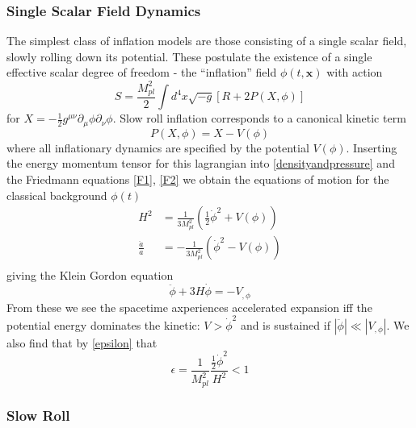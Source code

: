 \documentclass[a4paper,10pt]{article}
\renewcommand{\v}[1]{\mathbf{#1}}
\newcommand{\Mp}{M_{pl}}
\newcommand{\half}{\frac{1}{2}}
\begin{document}
\subsubsection{Single Scalar Field Dynamics}

The simplest class of inflation models are those consisting of a single scalar field, slowly rolling down its potential. These postulate the existence of a single effective scalar degree of freedom - the ``inflation'' field $\phi(t,\v{x})$ with action
\begin{equation}
S = \frac{\Mp^2}{2} \int d^4x \sqrt{-g}[R+2P(X,\phi)] 
\label{inflationaction}
\end{equation}
for $X=-\half g^{\mu\nu}\partial_\mu\phi\partial_\nu\phi$. Slow roll inflation corresponds to a canonical kinetic term 
\begin{equation}
P(X,\phi) = X - V(\phi)
\end{equation}
where all inflationary dynamics are specified by the potential $V(\phi)$. Inserting the energy momentum tensor for this lagrangian into \ref{densityandpressure} and the Friedmann equations \ref{F1}, \ref{F2} we obtain the equations of motion for the classical background $\phi(t)$
\begin{equation}\begin{split}
H^2 &= \frac{1}{3\Mp^2}\left(\half\dot{\phi}^2+V(\phi)\right)\\
\frac{\ddot{a}}{a} &= -\frac{1}{3\Mp^2}\left(\dot{\phi}^2-V(\phi)\right)\\
\end{split}\end{equation}
giving the Klein Gordon equation
\begin{equation}
\tag{KG}
\label{KG}
\ddot{\phi}+3H\dot{\phi}=-V_{,\phi}
\end{equation}
From these we see the spacetime axperiences accelerated expansion iff the potential energy dominates the kinetic: $V > \dot{\phi}^2$ and is sustained if $|\ddot{\phi}| \ll |V_{,\phi}|$. We also find that by \ref{epsilon} that 
\begin{equation}
\epsilon = \frac{1}{\Mp^2}\frac{\half\dot{\phi}^2}{H^2} < 1
\end{equation}

\subsubsection{Slow Roll}
\end{document}
